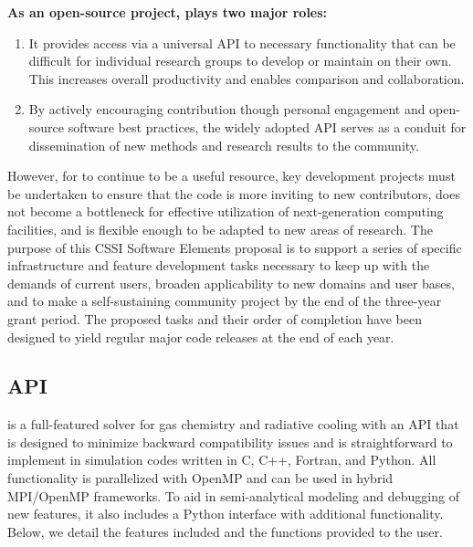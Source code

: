 \noindent
{\bf As an open-source project, \grackle{} plays two major roles:}
\begin{enumerate}
\item It provides access via a universal API to necessary functionality
that can be difficult for individual research groups to develop or
maintain on their own.  This increases overall productivity and
enables comparison and collaboration.
\item By actively encouraging contribution though personal engagement
and open-source software best practices, the widely adopted API serves
as a conduit for dissemination of new methods and research results to
the community.
\end{enumerate}
However, for \grackle{} to continue to be a useful resource, key
development projects must be undertaken to ensure that the code is
more inviting to new contributors, does not become a bottleneck
for effective utilization of next-generation computing facilities, 
and is flexible enough to be adapted to new areas of research.
The purpose of this CSSI Software Elements proposal is to support a
series of specific infrastructure and feature development tasks
necessary to keep up with the demands of current users, broaden
applicability to new domains and user bases, and to make \grackle{} a
self-sustaining community project by the end of the 
three-year grant period.  The proposed tasks and their order of
completion have been designed to yield regular major code releases at
the end of each year.

\subsection{\grackle{} API}\label{sec:arch}

\grackle{} is a full-featured solver for gas chemistry and radiative
cooling with an API that is designed to minimize backward
compatibility issues and is straightforward to implement in simulation
codes written in C, C++, Fortran, and Python.  All functionality is
parallelized with OpenMP and can be used in hybrid MPI/OpenMP
frameworks.  To aid in semi-analytical
modeling and debugging of new features, it also includes a Python
interface with additional functionality.  Below, we detail the
features included and the functions provided to the user.

